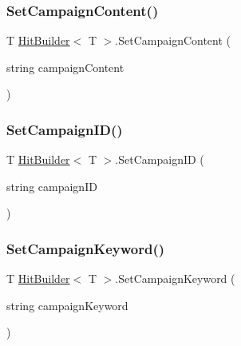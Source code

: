 \mbox{\label{class_hit_builder_afae82d6b7728f406b6ae074d804f6877}} 
\subsubsection{\texorpdfstring{Set\+Campaign\+Content()}{SetCampaignContent()}}
{\footnotesize\ttfamily T \hyperlink{class_hit_builder}{Hit\+Builder}$<$ T $>$.Set\+Campaign\+Content (\begin{DoxyParamCaption}\item[{string}]{campaign\+Content }\end{DoxyParamCaption})}

\mbox{\label{class_hit_builder_a769c78dab9c56eb9aece4bd2388c019f}} 
\subsubsection{\texorpdfstring{Set\+Campaign\+I\+D()}{SetCampaignID()}}
{\footnotesize\ttfamily T \hyperlink{class_hit_builder}{Hit\+Builder}$<$ T $>$.Set\+Campaign\+ID (\begin{DoxyParamCaption}\item[{string}]{campaign\+ID }\end{DoxyParamCaption})}

\mbox{\label{class_hit_builder_a2af536899c9cfabd3dfb6264d5820390}} 
\subsubsection{\texorpdfstring{Set\+Campaign\+Keyword()}{SetCampaignKeyword()}}
{\footnotesize\ttfamily T \hyperlink{class_hit_builder}{Hit\+Builder}$<$ T $>$.Set\+Campaign\+Keyword (\begin{DoxyParamCaption}\item[{string}]{campaign\+Keyword }\end{DoxyParamCaption})}

